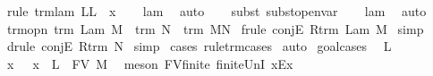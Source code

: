 \begin{isabellebody}
\ {\isacharparenleft}rule\ trm{\isachardot}lam{\isacharbrackleft}\ L{\isacharequal}{\isachardoublequoteopen}L\ {\isasymunion}\ {\isacharbraceleft}x{\isacharbraceright}{\isachardoublequoteclose}{\isacharbrackright}{\isacharparenright}\isanewline
\ \ \isamarkupfalse%
\ lam\ \isamarkupfalse%
\ auto{\isacharbrackleft}{}{\isacharbrackright}\isanewline
\ \ \isamarkupfalse%
\ {\isacharparenleft}subst\ subst{\isacharunderscore}open{\isacharunderscore}var{}{\isacharparenright}\isanewline
\ \ \isamarkupfalse%
\ lam\ \isamarkupfalse%
\ auto\isanewline
{}\isamarkupfalse%
%
\endisatagproof
{\isafoldproof}%
%
\isadelimproof
\isanewline
%
\endisadelimproof
\isanewline
{}\isamarkupfalse%
\ trm{\isacharunderscore}opn{\isacharcolon}\ {\isachardoublequoteopen}trm\ {\isacharparenleft}Lam\ M{\isacharparenright}\ {\isasymand}\ trm\ N\ {\isasymLongrightarrow}\ trm\ M{\isacharcircum}N{\isachardoublequoteclose}\isanewline
%
\isadelimproof
%
\endisadelimproof
%
\isatagproof
{}\isamarkupfalse%
\ {\isacharparenleft}frule\ conjE{\isacharbrackleft}\ R{\isacharequal}{\isachardoublequoteopen}trm\ {\isacharparenleft}Lam\ M{\isacharparenright}{\isachardoublequoteclose}{\isacharbrackright}{\isacharparenright}\isanewline
{}\isamarkupfalse%
\ simp\isanewline
{}\isamarkupfalse%
\ {\isacharparenleft}drule\ conjE{\isacharbrackleft}\ R{\isacharequal}{\isachardoublequoteopen}trm\ N{\isachardoublequoteclose}{\isacharbrackright}{\isacharparenright}\isanewline
{}\isamarkupfalse%
\ simp\isanewline
{}\isamarkupfalse%
\ {\isacharparenleft}cases\ rule{\isacharcolon}trm{\isachardot}cases{\isacharparenright}\isanewline
{}\isamarkupfalse%
\ auto\isanewline
{}\isamarkupfalse%
\ goal{\isacharunderscore}cases\isanewline
{}\isamarkupfalse%
\ {\isacharparenleft}{}\ L{\isacharparenright}\ \isanewline
\ \ \isamarkupfalse%
\ \isamarkupfalse%
\ x\ \ {}{\isacharcolon}\ {\isachardoublequoteopen}x\ {\isasymnotin}\ L\ {\isasymunion}\ FV\ M{\isachardoublequoteclose}\ \isamarkupfalse%
\ {\isacharparenleft}meson\ FV{\isacharunderscore}finite\ finite{\isacharunderscore}UnI\ x{\isacharunderscore}Ex{\isacharparenright}\isanewline
\ \ \isamarkupfalse%
\ {}\ \isamarkupfalse%

\end{isabellebody}
